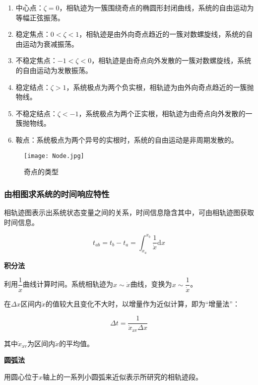 \documentclass[cn, blue, normal, 12pt]{elegantnote}
\begin{document}
\begin{enumerate}
    \setlength{\itemsep}{6pt}
    \item 中心点：$\zeta=0$，相轨迹为一簇围绕奇点的椭圆形封闭曲线，系统的自由运动为等幅正弦振荡。
    \item 稳定焦点：$0<\zeta<1$，相轨迹是由外向奇点趋近的一簇对数螺旋线，系统的自由运动为衰减振荡。
    \item 不稳定焦点：$-1<\zeta<0$，相轨迹是由奇点向外发散的一簇对数螺旋线，系统的自由运动为发散振荡。
    \item 稳定结点：$\zeta>1$，系统极点为两个负实根，相轨迹为由外向奇点趋近的一簇抛物线。
    \item 不稳定结点：$\zeta<-1$，系统极点为两个正实根，相轨迹为由奇点向外发散的一簇抛物线。
    \item 鞍点：系统极点为两个异号的实根时，系统的自由运动是非周期发散的。
\end{enumerate}

\begin{figure}[htbp]
    \centering
    \texttt{[image: Node.jpg]}
    \caption{奇点的类型}
\end{figure}

\subsubsection{由相图求系统的时间响应特性}

相轨迹图表示出系统状态变量之间的关系，时间信息隐含其中，可由相轨迹图获取时间信息。

\begin{equation}
    t_{ab}=t_b-t_a=\int_{x_a}^{x_b}\frac{1}{\dot{x}}\mathrm{d}x
\end{equation}

\textbf{积分法}

利用$\dfrac{1}{\dot{x}}$曲线计算时间。系统相轨迹为$x\sim \dot{x}$曲线，变换为$x\sim \dfrac{1}{\dot{x}}$。

在$\Delta x$区间内$\dot{x}$的值较大且变化不大时，以增量作为近似计算，即为“增量法”：

\begin{equation}
    \Delta t=\frac{1}{\dot{x}_{\mathrm{av}}\Delta x}
\end{equation}

其中$\dot{x}_{\mathrm{av}}$为区间内$\dot{x}$的平均值。

\textbf{圆弧法}

用圆心位于$x$轴上的一系列小圆弧来近似表示所研究的相轨迹段。
\end{document}
